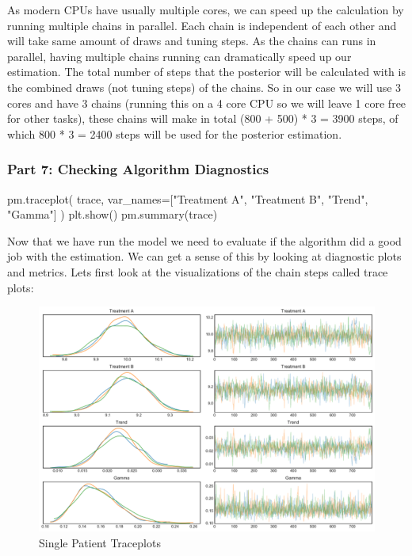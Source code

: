 \documentclass[12pt,a4paper,leqno]{report}
\theoremstyle{plain}
\theoremstyle{definition}
\theoremstyle{remark}
\begin{document}
As modern CPUs have usually multiple cores, we can speed up the calculation by running
multiple chains in parallel. Each chain is independent of each other and will
take same amount of draws and tuning steps. As the chains can runs in parallel, having
multiple chains running can dramatically speed up our estimation. The total number of steps that
the posterior will be calculated with is the combined draws (not tuning steps) of the
chains. So in our case we will use 3 cores and have 3 chains (running this on a 4 core
CPU so we will leave 1 core free for other tasks), these chains will make in total (800 +
500) * 3 = 3900 steps, of which 800 * 3 = 2400 steps will be used for the posterior estimation.

\subsubsection*{Part 7: Checking Algorithm Diagnostics}

\bigskip
\begin{pyverbatim}[][fontsize=\footnotesize]
    pm.traceplot(
            trace, var_names=["Treatment A", "Treatment B", "Trend", "Gamma"]
        )
    plt.show()
    pm.summary(trace)
\end{pyverbatim}
\smallskip

Now that we have run the model we need to evaluate if the algorithm did a good job with
the estimation. We can get a sense of this by looking at diagnostic plots and metrics.
Lets first look at the visualizations of the chain steps called trace plots:

\begin{figure}[H]
    \caption{Single Patient Traceplots}\label{traceplots}
    \includegraphics[width=\textwidth,height=\textheight,keepaspectratio]{single_patient_traceplot.pdf}
\end{figure}
\end{document}
